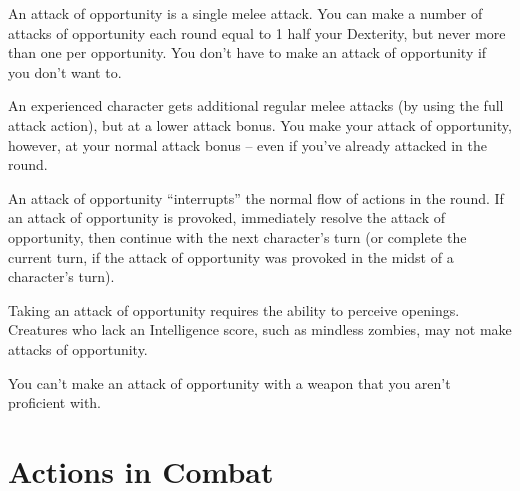 An attack of opportunity is a single melee attack. You can make a number of attacks of opportunity each round equal to 1 \add half your Dexterity, but never more than one per opportunity. You don't have to make an attack of opportunity if you don't want to.

An experienced character gets additional regular melee attacks (by using the full attack action), but at a lower attack bonus. You make your attack of opportunity, however, at your normal attack bonus -- even if you've already attacked in the round.

An attack of opportunity ``interrupts'' the normal flow of actions in the round. If an attack of opportunity is provoked, immediately resolve the attack of opportunity, then continue with the next character's turn (or complete the current turn, if the attack of opportunity was provoked in the midst of a character's turn).

 Taking an attack of opportunity requires the ability to perceive openings. Creatures who lack an Intelligence score, such as mindless zombies, may not make attacks of opportunity.

 You can't make an attack of opportunity with a weapon that you aren't proficient with.

\section{Actions in Combat}

